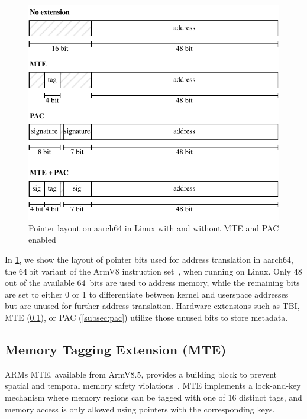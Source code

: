 \begin{figure}[t]
    \centering
    \includegraphics[scale=1]{figures/build/pointer-aarch64}
    \caption{Pointer layout on aarch64 in Linux with and without \ac{MTE} and \ac{PAC} enabled}
    \label{fig:aarch64-pointer}
\end{figure}

In \cref{fig:aarch64-pointer}, we show the layout of pointer bits used for address translation in aarch64, the 64\,bit variant of the ArmV8 instruction set~\cite{ARMA2024Arch64}, when running on Linux.
Only 48 out of the available 64\ bits are used to address memory, while the remaining bits are set to either 0 or 1 to differentiate between kernel and userspace addresses but are unused for further address translation.
Hardware extensions such as \ac{TBI}, \ac{MTE} (\cref{subsec:mte}), or \ac{PAC} (\cref{subsec:pac}) utilize those unused bits to store metadata.

\subsection{Memory Tagging Extension (MTE)}
\label{subsec:mte}

ARMs \Ac{MTE}, available from ArmV8.5, provides a building block to prevent spatial and temporal memory safety violations~\cite{ARM2019MTE}.
\Ac{MTE} implements a lock-and-key mechanism where memory regions can be tagged with one of 16 distinct tags, and memory access is only allowed using pointers with the corresponding keys.

